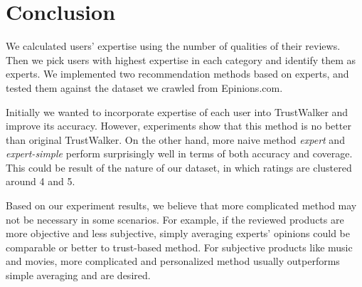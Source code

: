 \documentclass[12pt]{article}
\begin{document}
\section{Conclusion}
We calculated users' expertise using the number of qualities of their reviews. Then we pick users with highest expertise in each category and identify them as experts. We implemented two recommendation methods based on experts, and tested them against the dataset we crawled from Epinions.com. 

Initially we wanted to incorporate expertise of each user into TrustWalker and improve its accuracy. However, experiments show that this method is no better than original TrustWalker. On the other hand, more naive method \emph{expert} and \emph{expert-simple} perform surprisingly well in terms of both accuracy and coverage. This could be result of the nature of our dataset, in which ratings are clustered around 4 and 5. 

Based on our experiment results, we believe that more complicated method may not be necessary in some scenarios. For example, if the reviewed products are more objective and less subjective, simply averaging experts' opinions could be comparable or better to trust-based method. For subjective products like music and movies, more complicated and personalized method usually outperforms simple averaging and are desired. 



\end{document}
